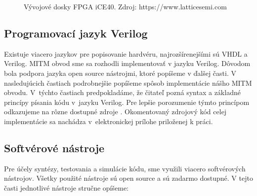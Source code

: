 \begin{figure}
    \centering
    \hfill
    \caption[Vývojové dosky FPGA iCE40]{Vývojové dosky FPGA iCE40. Zdroj: https://www.latticesemi.com}
    \label{obr:iceHw}
\end{figure}

\subsection{Programovací jazyk Verilog}
Existuje viacero jazykov pre popisovanie hardvéru, najrozšírenejšími sú VHDL a Verilog. MITM obvod sme sa rozhodli implementovať v jazyku Verilog. Dôvodom bola podpora jazyka open source nástrojmi, ktoré popíšeme v ďalšej časti. V nasledujúcich častiach podrobnejšie popíšeme spôsob implementácie nášho MITM obvodu. V~týchto častiach predpokladáme, že čitateľ pozná syntax a základné princípy písania kódu v~jazyku Verilog. Pre lepšie porozumenie týmto princípom odkazujeme na rôzne dostupné zdroje \cite{verilogTutorial, verilogBook}. Okomentovaný zdrojový kód celej implementácie sa nachádza v~elektronickej prílohe priloženej k práci.

\subsection{Softvérové nástroje}\label{subsek:software}
Pre účely syntézy, testovania a simulácie kódu, sme využili viacero softvérových nástrojov. Všetky použité nástroje sú open source a sú zadarmo dostupné. V tejto časti jednotlivé nástroje stručne opíšeme:

